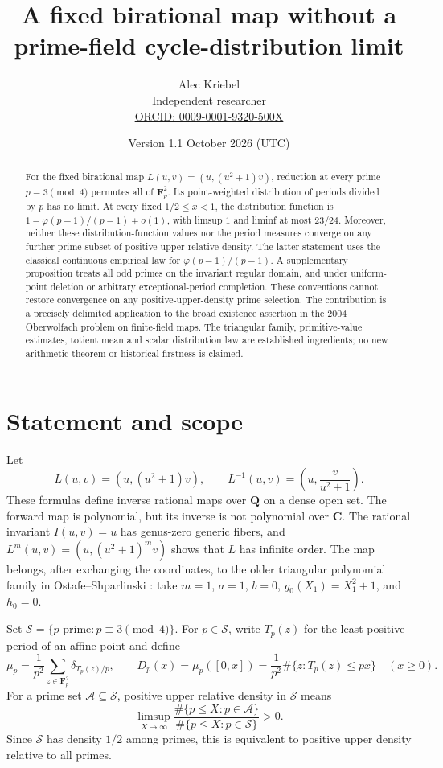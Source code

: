 \documentclass[11pt]{article}
\title{A fixed birational map without a\\prime-field cycle-distribution limit}
\author{Alec Kriebel\\[3pt]\small Independent researcher\\\small \href{https://orcid.org/0009-0001-9320-500X}{ORCID: 0009-0001-9320-500X}}
\date{Version 1.1 \quad 21 October 2026 (UTC)}
\theoremstyle{remark}
\newcommand{\Fp}{\mathbf F_p}
\newcommand{\Q}{\mathbf Q}
\newcommand{\C}{\mathbf C}
\begin{document}
\maketitle
\begin{abstract}
For the fixed birational map $L(u,v)=(u,(u^2+1)v)$, reduction at every
prime $p\equiv3\pmod4$ permutes all of $\Fp^2$. Its point-weighted
distribution of periods divided by $p$ has no limit. At every fixed
$1/2\le x<1$, the distribution function is
$1-\varphi(p-1)/(p-1)+o(1)$, with limsup $1$ and liminf at most $23/24$.
Moreover, neither these distribution-function values nor the period
measures converge on any further prime subset of positive upper relative
density. The latter statement uses the classical continuous empirical
law for $\varphi(p-1)/(p-1)$. A supplementary proposition treats all odd
primes on the invariant regular domain, and under uniform-point deletion
or arbitrary exceptional-period completion. These conventions cannot
restore convergence on any positive-upper-density prime selection.
The contribution is a precisely delimited
application to the broad existence assertion in the 2004 Oberwolfach
problem on finite-field maps. The triangular family, primitive-value
estimates, totient mean and scalar distribution law are established
ingredients; no new arithmetic theorem or historical firstness is claimed.
\end{abstract}

\section{Statement and scope}
Let
\begin{equation}\label{eq:map}
 L(u,v)=(u,(u^2+1)v),\qquad
 L^{-1}(u,v)=\left(u,\frac{v}{u^2+1}\right).
\end{equation}
These formulas define inverse rational maps over $\Q$ on a dense open
set. The forward map is polynomial, but its inverse is not polynomial
over $\C$. The rational invariant $I(u,v)=u$ has genus-zero generic
fibers, and $L^m(u,v)=(u,(u^2+1)^m v)$ shows that $L$ has infinite order.
The map belongs, after exchanging the coordinates, to the older
triangular polynomial family in Ostafe--Shparlinski
\cite[\S2.1, (1)--(4)]{OS}: take $m=1$, $a=1$, $b=0$,
$g_0(X_1)=X_1^2+1$, and $h_0=0$.

Set $\mathcal S=\{p\text{ prime}:p\equiv3\pmod4\}$. For $p\in\mathcal S$,
write $T_p(z)$ for the least positive period of an affine point and define
\begin{equation}\label{eq:measure}
 \mu_p=\frac1{p^2}\sum_{z\in\Fp^2}\delta_{T_p(z)/p},
 \qquad D_p(x)=\mu_p([0,x])
       =\frac1{p^2}\#\{z:T_p(z)\le px\}\quad(x\ge0).
\end{equation}
For a prime set $\mathcal A\subseteq\mathcal S$, positive upper relative
density in $\mathcal S$ means
\begin{equation}\label{eq:density}
 \limsup_{X\to\infty}
 \frac{\#\{p\le X:p\in\mathcal A\}}{\#\{p\le X:p\in\mathcal S\}}>0.
\end{equation}
Since $\mathcal S$ has density $1/2$ among primes, this is equivalent to
positive upper density relative to all primes.
\end{document}

